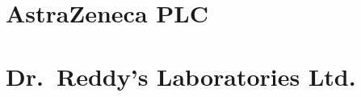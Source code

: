 \documentclass[a4paper,11pt,DIV=12,parskip=half]{scrartcl}
\begin{document}

\tableofcontents
\clearpage


\renewcommand{\teiltitel}{AstraZeneca PLC}
\part{AstraZeneca PLC}








\renewcommand{\teiltitel}{Dr.~Reddy's Laboratories Ltd.}
\part{Dr.~Reddy's Laboratories Ltd.}








\clearpage
\markright{}


\end{document}
